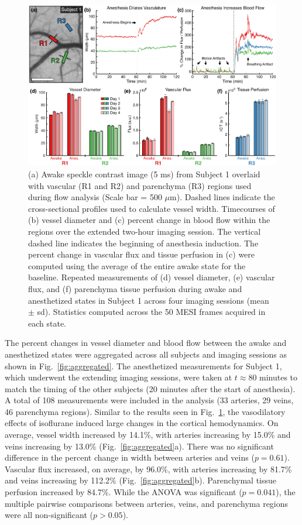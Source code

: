 \documentclass[review]{elsarticle}
\begin{document}
\begin{figure}
    \includegraphics[width=\textwidth]{Figure2.pdf}
    \caption {
        (a) Awake speckle contrast image (5 ms) from Subject 1 overlaid with vascular (R1 and R2) and parenchyma (R3) regions used during flow analysis (Scale bar = 500 $\mu$m). Dashed lines indicate the cross-sectional profiles used to calculate vessel width. Timecourses of (b) vessel diameter and (c) percent change in blood flow within the regions over the extended two-hour imaging session. The vertical dashed line indicates the beginning of anesthesia induction. The percent change in vascular flux and tissue perfusion in (c) were computed using the average of the entire awake state for the baseline. Repeated measurements of (d) vessel diameter, (e) vascular flux, and (f) parenchyma tissue perfusion during awake and anesthetized states in Subject 1 across four imaging sessions (mean $\pm$ sd). Statistics computed across the 50 MESI frames acquired in each state.
    }
    \label{fig:timecourse}
\end{figure}

The percent changes in vessel diameter and blood flow between the awake and anesthetized states were aggregated across all subjects and imaging sessions as shown in Fig.~\ref{fig:aggregated}. The anesthetized measurements for Subject 1, which underwent the extending imaging sessions, were taken at $t \approx 80$ minutes to match the timing of the other subjects (20 minutes after the start of anesthesia). A total of 108 measurements were included in the analysis (33 arteries, 29 veins, 46 parenchyma regions). Similar to the results seen in Fig.~\ref{fig:timecourse}, the vasodilatory effects of isoflurane induced large changes in the cortical hemodynamics. On average, vessel width increased by 14.1\%, with arteries increasing by 15.0\% and veins increasing by 13.0\% (Fig.~\ref{fig:aggregated}a). There was no significant difference in the percent change in width between arteries and veins ($p = 0.61$). Vascular flux increased, on average, by 96.0\%, with arteries increasing by 81.7\% and veins increasing by 112.2\% (Fig.~\ref{fig:aggregated}b). Parenchymal tissue perfusion increased by 84.7\%. While the ANOVA was significant ($p = 0.041$), the multiple pairwise comparisons between arteries, veins, and parenchyma regions were all non-significant ($p > 0.05$).
\end{document}
